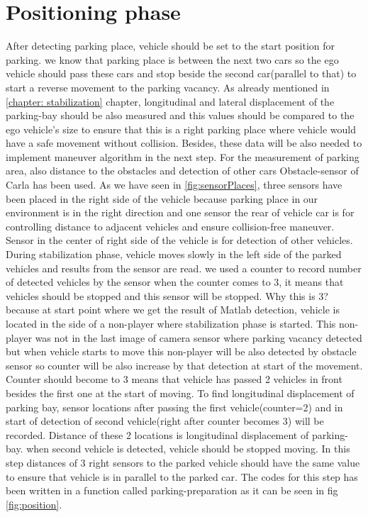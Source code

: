 \section{Positioning phase}
After detecting parking place, vehicle should be set to the start position for parking. we know that parking place is between the next two cars so the ego vehicle should pass these cars and stop beside the second car(parallel to that) to start a reverse movement to the parking vacancy. 
As already mentioned in \ref{chapter: stabilization} chapter, longitudinal and lateral displacement of the parking-bay should be also measured and this values should be compared to the ego vehicle's size to ensure that this is a right parking place where vehicle would have a safe movement without collision. Besides, these data will be also needed to implement maneuver algorithm in the next step. For the measurement of parking area, also distance to the obstacles and detection of other cars Obstacle-sensor of Carla has been used. As we have seen in \ref{fig:sensorPlaces}, three sensors have been placed in the right side of the vehicle because parking place in our environment is in the right direction and one sensor the rear of vehicle car is for controlling distance to adjacent vehicles and ensure collision-free maneuver.
Sensor in the center of right side of the vehicle is for detection of other vehicles. During stabilization phase, vehicle moves slowly in the left side of the parked vehicles and results from the sensor are read. we used a counter to record number of detected vehicles by the sensor when the counter comes to 3, it means that vehicles should be stopped and this sensor will be stopped. Why this is 3? because at start point where we get the result of Matlab detection, vehicle is located in the side of a non-player where stabilization phase is started. This non-player was not in the last image of camera sensor where parking vacancy detected but when vehicle starts to move this non-player will be also detected by obstacle sensor so counter will be also increase by that detection at start of the movement. Counter should become to 3 means that vehicle has passed 2 vehicles in front besides the first one at the start of moving. To find longitudinal displacement of parking bay, sensor locations after passing the first vehicle(counter=2) and in start of detection of second vehicle(right after counter becomes 3) will be recorded. Distance of these 2 locations is longitudinal displacement of parking-bay. 
when second vehicle is detected, vehicle should be stopped moving. In this step distances of 3 right sensors to the parked vehicle should have the same value to ensure that vehicle is in parallel to the parked car. The codes for this step has been written in a function called parking-preparation as it can be seen in fig \ref{fig:position}.
